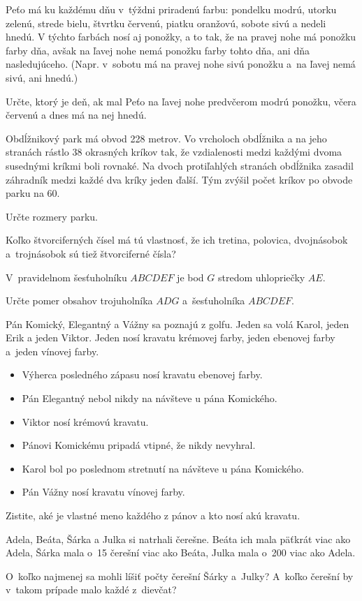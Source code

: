 {%
Peťo má ku každému dňu v~týždni priradenú farbu:
pondelku modrú, utorku zelenú, strede bielu, štvrtku červenú, piatku oranžovú, sobote sivú a nedeli hnedú.
V týchto farbách nosí aj ponožky, a to tak, že na pravej nohe má ponožku farby dňa, avšak na ľavej nohe nemá ponožku farby tohto dňa, ani dňa nasledujúceho.
(Napr. v~sobotu má na pravej nohe sivú ponožku a~na ľavej nemá sivú, ani hnedú.)

Určte, ktorý je deň, ak mal Peťo na ľavej nohe predvčerom modrú ponožku, včera červenú a dnes má na nej hnedú.
}

{%
Obdĺžnikový park má obvod 228 metrov.
Vo vrcholoch obdĺžnika a na jeho stranách rástlo 38 okrasných kríkov tak, že vzdialenosti medzi každými dvoma susednými kríkmi boli rovnaké.
Na dvoch protiľahlých stranách obdĺžnika zasadil záhradník medzi každé dva kríky jeden ďalší.
Tým zvýšil počet kríkov po obvode parku na 60.

Určte rozmery parku.
}

{%
Koľko štvorciferných čísel má tú vlastnosť, že ich tretina, polovica, dvojnásobok a~trojnásobok sú tiež štvorciferné čísla?
}

{%
V~pravidelnom šesťuholníku $ABCDEF$ je bod $G$ stredom uhlopriečky $AE$.

Určte pomer obsahov trojuholníka $ADG$ a~šesťuholníka $ABCDEF$.
}

{%
Pán Komický, Elegantný a Vážny sa poznajú z golfu.
Jeden sa volá Karol, jeden Erik a jeden Viktor.
Jeden nosí kravatu krémovej farby, jeden ebenovej farby a~jeden vínovej farby.
\begin{itemize}
  \item Výherca posledného zápasu nosí kravatu ebenovej farby.
  \item Pán Elegantný nebol nikdy na návšteve u pána Komického.
  \item Viktor nosí krémovú kravatu.
  \item Pánovi Komickému pripadá vtipné, že nikdy nevyhral.
  \item Karol bol po poslednom stretnutí na návšteve u pána Komického.
  \item Pán Vážny nosí kravatu vínovej farby.
\end{itemize}
Zistite, aké je vlastné meno každého z pánov a kto nosí akú kravatu.
}

{%
Adela, Beáta, Šárka a Julka si natrhali čerešne.
Beáta ich mala päťkrát viac ako Adela, Šárka mala o~15 čerešní viac ako Beáta, Julka mala o~200 viac ako Adela.

O~koľko najmenej sa mohli líšiť počty čerešní Šárky a~Julky?
A~koľko čerešní by v~takom prípade malo každé z~dievčat?
}

